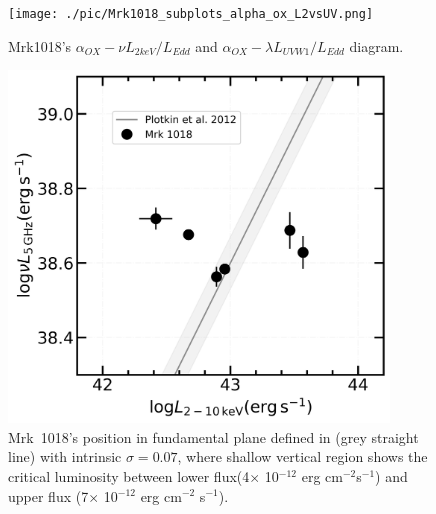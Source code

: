 \documentclass[twocolumn]{aastex63}
\begin{document}
\begin{figure}
\centering
	\texttt{[image: ./pic/Mrk1018\_subplots\_alpha\_ox\_L2vsUV.png]}
    \caption{Mrk1018's $\alpha_{OX}-\nu L_{2keV}/L_{Edd}$ and $\alpha_{OX}-\lambda L_{UVW1}/L_{Edd}$ diagram.}
    \label{fig:alpha_ox_luv}
\end{figure}



\begin{figure}
\centering
	\includegraphics[width=0.9\textwidth]{./pic/Mrk1018_radio_xray_Plotkin2012_Lx.png}
    \caption{Mrk~1018's position in fundamental plane defined in \citet{2012MNRAS.419..267P} (grey straight line) with intrinsic $\sigma=0.07$, where shallow vertical region shows the critical luminosity between lower flux(4$\times$ 10$^{-12}$ erg cm$^{-2} $s$^{-1}$) and upper flux (7$\times$ 10$^{-12}$ erg cm$^{-2}$ s$^{-1}$).}
    \label{fig:radio-xray-mass_relation_Plotkin2012}
\end{figure}


%
\end{document}

